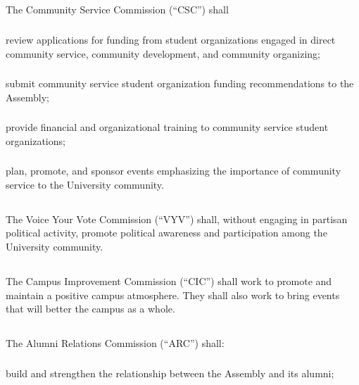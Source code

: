 \subsection{}
The Community Service Commission (``CSC'') shall 
\subsubsection{}
review applications for funding from student organizations engaged in direct community service, community development, and community organizing;
\subsubsection{}
submit community service student organization funding recommendations to the Assembly;
\subsubsection{}
provide financial and organizational training to community service student organizations;
\subsubsection{}
plan, promote, and sponsor events emphasizing the importance of community service to the University community.


\subsection{}
The Voice Your Vote Commission (``VYV'') shall, without engaging in partisan political activity, promote political awareness and participation among the University community.

\subsection{}
The Campus Improvement Commission (``CIC'') shall work to promote and maintain a positive campus atmosphere. They shall also work to bring events that will better the campus as a whole. 

\subsection{}
The Alumni Relations Commission (``ARC'') shall:
\subsubsection{}
build and strengthen the relationship between the Assembly and its 
alumni;
